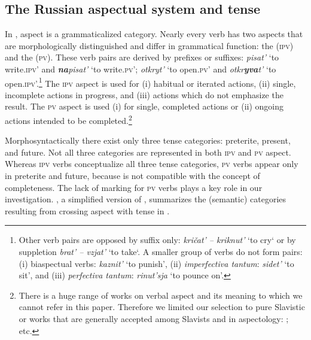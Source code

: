 \documentclass[output=paper,colorlinks,citecolor=brown,newtxmath,hidelinks]{langscibook}
\begin{document}
\subsection{The Russian aspectual system and tense} \label{sub:eins:2}

In , aspect is a grammaticalized category. Nearly every  verb has two aspects that are morphologically distinguished and differ in grammatical function: the  (\textsc{ipv}) and the  (\textsc{pv}). These verb pairs are derived by prefixes or suffixes: \textit{pisat'} ‘to write\textsc{.ipv}’ and \textit{\textbf{na}pisat'} ‘to write\textsc{.pv}’; \textit{otkryt'} ‘to open\textsc{.pv}’ and \textit{otkr\textbf{yva}t'} ‘to open\textsc{.ipv}’.\footnote{Other verb pairs are opposed by suffix only: \textit{kričat' -- kriknut'} ‘to cry‘ or by suppletion \textit{brat' -- vzjat'} ‘to take‘. A smaller group of verbs do not form pairs: (i) biaspectual verbs: \textit{kaznit'} ‘to punish’, (ii) \textit{imperfectiva tantum}: \textit{sidet'} ‘to sit’, and (iii) \textit{perfectiva tantum}: \textit{rinut'sja} ‘to pounce on’.} The \textsc{ipv} aspect is used for (i) habitual or iterated actions, (ii) single, incomplete actions in progress, and (iii) actions which do not emphasize the result. The \textsc{pv} aspect is used (i) for  single, completed actions or (ii) ongoing actions intended to be completed.\footnote{There is a huge range of works on verbal aspect and its meaning to which we cannot refer in this paper. Therefore we limited our selection to pure Slavistic or  works that are generally accepted among Slavists and in  aspectology: \citet{Anstatt2003,Avilova1976,Bondarko1971,Breu1980,Breu2000ProblemederInteraktion,Comrie1976,Dickey2000,Galton1976,Klein1995,Lehmann1999,Maslov1984,Mehlig1980,Paduceva1996,Petruchina2000,Rassudova1968,Zaliznjak2000}; etc.}

Morphosyntactically there exist only  three tense categories: preterite, present, and future. Not all three categories are represented in both \textsc{ipv} and \textsc{pv} aspect. Whereas \textsc{ipv} verbs conceptualize all three tense categories, \textsc{pv} verbs appear only in preterite and future, because  is not compatible with the concept of completeness. The lack of  marking for \textsc{pv} verbs plays a key role in our investigation. , a simplified version of \citet{Swan1978}, summarizes the (semantic) categories resulting from crossing aspect with tense in .
\end{document}
